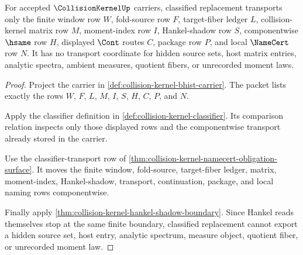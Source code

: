 \begin{theorem}
\label{thm:collision-kernel-classifier-transport-scope}
For accepted $\CollisionKernelUp$ carriers, classified replacement transports only the finite window row $W$, fold-source row $F$, target-fiber ledger $L$, collision-kernel matrix row $M$, moment-index row $I$, Hankel-shadow row $S$, componentwise $\hsame$ row $H$, displayed $\Cont$ routes $C$, package row $P$, and local $\NameCert$ row $N$. It has no transport coordinate for hidden source sets, host matrix entries, analytic spectra, ambient measures, quotient fibers, or unrecorded moment laws.
\end{theorem}
\begin{proof}
Project the carrier in \autoref{def:collision-kernel-bhist-carrier}. The packet lists exactly the rows $W$, $F$, $L$, $M$, $I$, $S$, $H$, $C$, $P$, and $N$.

Apply the classifier definition in \autoref{def:collision-kernel-classifier}. Its comparison relation inspects only those displayed rows and the componentwise transport already stored in the carrier.

Use the classifier-transport row of \autoref{thm:collision-kernel-namecert-obligation-surface}. It moves the finite window, fold-source, target-fiber ledger, matrix, moment-index, Hankel-shadow, transport, continuation, package, and local naming rows componentwise.

Finally apply \autoref{thm:collision-kernel-hankel-shadow-boundary}. Since Hankel reads themselves stop at the same finite boundary, classified replacement cannot export a hidden source set, host entry, analytic spectrum, measure object, quotient fiber, or unrecorded moment law.
\end{proof}


